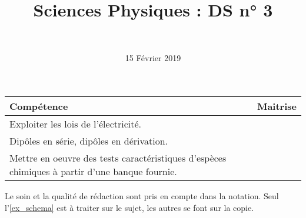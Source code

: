 \documentclass[a4paper,11pt]{exam}
\author{\ }
\date{15 Février 2019}
\title{Sciences Physiques : DS n° 3}
\begin{document}
%	


	\maketitle


\begin{small}
	\begin{center}
		\begin{tabular}{|@{\ }l@{}|@{\ }c@{\ }|}
			\hline
			\textbf{Compétence} & \textbf{Maitrise} \\
			\hline
			 Exploiter les lois de l’électricité. \ \ &  \ \ \ \\
			\hline
			Dipôles en série, dipôles en dérivation. &  \\
			\hline			
			Mettre en oeuvre des tests caractéristiques d’espèces chimiques à partir d’une banque fournie.  &  \\
			\hline
			
		\end{tabular}
	\end{center}
\end{small}	
%	

Le soin et la qualité de rédaction sont pris en compte dans la notation.
Seul l'\ref{ex_schema} est à traiter sur le sujet, les autres se font sur la copie.

\vspace*{-0.5cm}
%











\newpage



\newpage





\ \label{LastPage}
\end{document}
